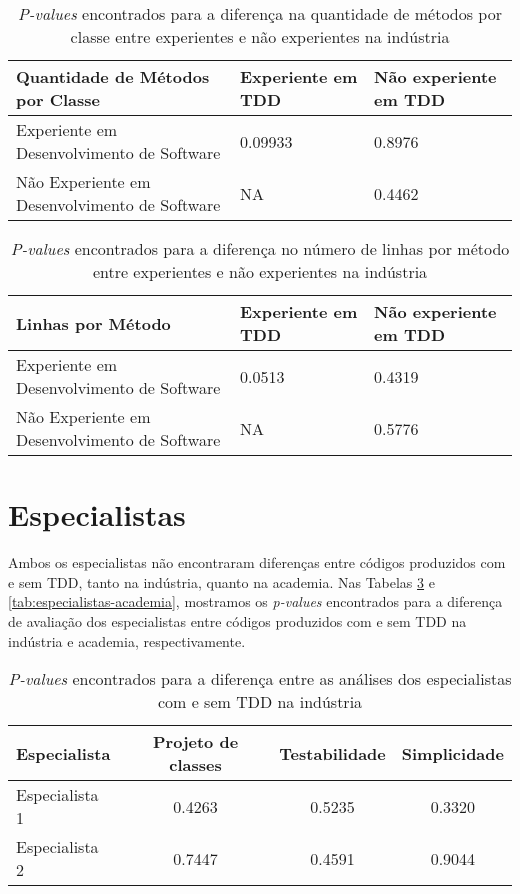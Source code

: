 \begin{table}[h!]
	\centering
	\begin{tabular}{ | p{5cm} | p{5cm} | p{5cm} | }
		\hline
		 Quantidade de Métodos por Classe & Experiente em TDD & Não experiente em TDD \\
		\hline
			Experiente em Desenvolvimento de Software 		& 0.09933	&	0.8976\\
			\hline
			Não Experiente em Desenvolvimento de Software 	& NA		&	0.4462\\
		\hline
	\end{tabular}
	\caption{\textit{P-values} encontrados para a diferença na quantidade de métodos por classe entre experientes e não experientes na indústria}
	\label{valores-exp-metodos-industria}
\end{table}

\begin{table}[h!]
	\centering
	\begin{tabular}{ | p{5cm} | p{5cm} | p{5cm} | }
		\hline
		 Linhas por Método & Experiente em TDD & Não experiente em TDD \\
		\hline
			Experiente em Desenvolvimento de Software 		& 0.0513	&	0.4319\\
			\hline
			Não Experiente em Desenvolvimento de Software 	& NA		&	0.5776\\
		\hline
	\end{tabular}
	\caption{\textit{P-values} encontrados para a diferença no número de linhas por método entre experientes e não experientes na indústria}
	\label{valores-exp-linhas-industria}
\end{table}

\newpage
\section{Especialistas}

Ambos os especialistas não encontraram diferenças entre códigos produzidos
com e sem TDD, tanto na indústria, quanto na academia. Nas Tabelas 
\ref{tab:especialistas-industria} e \ref{tab:especialistas-academia},
mostramos os \textit{p-values} encontrados para a diferença de avaliação dos especialistas
entre códigos produzidos com e sem TDD na indústria e academia, respectivamente.


\begin{table}[h!]
	\centering
	\begin{tabular}{| p{5cm} | c | c | c | }
		\hline
		Especialista & Projeto de classes & Testabilidade & Simplicidade\\
		\hline
		Especialista 1 &	0.4263 &	0.5235 &	0.3320\\
		Especialista 2 &	0.7447 &	0.4591 &	0.9044\\
		\hline
	\end{tabular}
	\caption{\textit{P-values} encontrados para a diferença entre as análises dos especialistas com e sem TDD na indústria}
	\label{tab:especialistas-industria}
\end{table}

